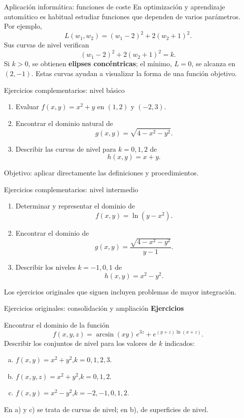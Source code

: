 \documentclass[main.tex]{subfiles}
\begin{document}
\begin{frame}{Aplicación informática: funciones de coste}
En optimización y aprendizaje automático es habitual estudiar
funciones que dependen de varios parámetros.
\medskip
Por ejemplo,
\[
L(w_1,w_2)=(w_1-2)^2+2(w_2+1)^2.
\]
Sus curvas de nivel verifican
\[
(w_1-2)^2+2(w_2+1)^2=k.
\]
\medskip
Si $k>0$, se obtienen \textbf{elipses concéntricas};
el mínimo, $L=0$, se alcanza en $(2,-1)$.
Estas curvas ayudan a visualizar la forma de una función objetivo.
\end{frame}

\begin{frame}{Ejercicios complementarios: nivel básico}
\begin{enumerate}
\item Evaluar $f(x,y)=x^2+y$ en $(1,2)$ y $(-2,3)$.
\medskip
\item Encontrar el dominio natural de
\[
g(x,y)=\sqrt{4-x^2-y^2}.
\]
\item Describir las curvas de nivel para $k=0,1,2$ de
\[
h(x,y)=x+y.
\]
\end{enumerate}
\medskip
\small
Objetivo: aplicar directamente las definiciones y procedimientos.
\end{frame}

\begin{frame}{Ejercicios complementarios: nivel intermedio}
\begin{enumerate}
\item Determinar y representar el dominio de
\[
f(x,y)=\ln(y-x^2).
\]
\item Encontrar el dominio de
\[
g(x,y)=\frac{\sqrt{4-x^2-y^2}}{y-1}.
\]
\item Describir los niveles $k=-1,0,1$ de
\[
h(x,y)=x^2-y^2.
\]
\end{enumerate}
\medskip
\small
Los ejercicios originales que siguen incluyen problemas de mayor integración.
\end{frame}

\begin{frame}{Ejercicios originales: consolidación y ampliación}
\small\textbf{Ejercicios}
\medskip

Encontrar el dominio de la función
\[f(x,y,z)=\arcsin(xy)\,e^{3z}+e^{(y+z)\ln(x+z)}.\]
Describir los conjuntos de nivel para los valores de $k$ indicados:
\begin{enumerate}[a)]
\item $f(x,y)=x^2+y^2$,\quad $k=0,1,2,3$.
\item $f(x,y,z)=x^2+y^2$,\quad $k=0,1,2$.
\item $f(x,y)=x^2-y^2$,\quad $k=-2,-1,0,1,2$.
\end{enumerate}
En a) y c) se trata de curvas de nivel; en b), de superficies de nivel.
\end{frame}
\end{document}
